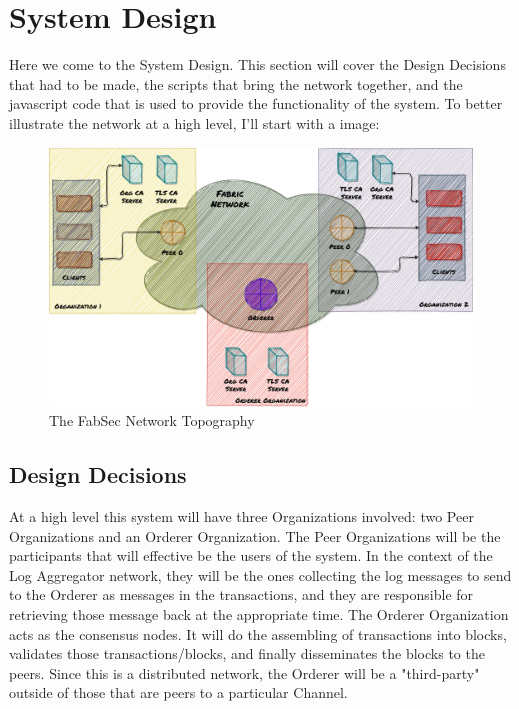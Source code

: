 \section{System Design}
	\hspace{10mm}Here we come to the System Design. This section will cover the Design Decisions that had to be made, the scripts that bring the network together, and the javascript code that is used to provide the functionality of the system. To better illustrate the network at a high level, I'll start with a image:\\
	
	\begin{figure}[h!]
		\includegraphics[width=\textwidth]{./fabsec-report-system-design/fabric-network-diagram.png}
		\caption{The FabSec Network Topography}
	\end{figure}
	
	\subsection{Design Decisions}
		\hspace{10mm}At a high level this system will have three Organizations involved: two Peer Organizations and an Orderer Organization. The Peer Organizations will be the participants that will effective be the users of the system. In the context of the Log Aggregator network, they will be the ones collecting the log messages to send to the Orderer as messages in the transactions, and they are responsible for retrieving those message back at the appropriate time. The Orderer Organization acts as the consensus nodes. It will do the assembling of transactions into blocks, validates those transactions/blocks, and finally disseminates the blocks to the peers. Since this is a distributed network, the Orderer will be a "third-party" outside of those that are peers to a particular Channel.\\
	
